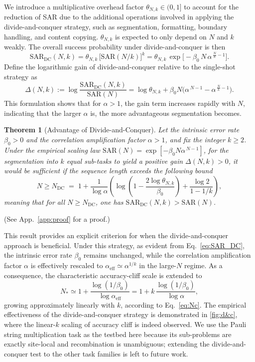 \documentclass{article}
\theoremstyle{plain}
\newtheorem{theorem}{Theorem}
\begin{document}
We introduce a multiplicative overhead factor $\theta_{N,k}\in(0,1]$ to account for the reduction of SAR due to the additional operations involved in applying the divide-and-conquer strategy, such as segmentation, formatting, boundary handling, and content copying. $\theta_{N,k}$ is expected to only  depend on $N$ and $k$ weakly. The overall success probability under divide-and-conquer is then
\begin{equation}\label{eq:SAR_DC}
\mathrm{SAR}_{\mathrm{DC}}(N,k)
= \theta_{N,k}\,\big[\mathrm{SAR}(N/k)\big]^k
= \theta_{N,k}\,\exp\!\Big[-\beta_0\,N\,\alpha^{\,\frac{N}{k}-1}\Big].
\end{equation}
Define the logarithmic gain of divide-and-conquer relative to the single-shot strategy as
\begin{equation}
\Delta(N,k)
:= \log \frac{\mathrm{SAR}_{\mathrm{DC}}(N,k)}{\mathrm{SAR}(N)}
= \log \theta_{N,k} + \beta_0 N \Big( \alpha^{\,N-1} - \alpha^{\,\frac{N}{k}-1} \Big).
\end{equation}
This formulation shows that for $\alpha>1$, the gain term increases rapidly with $N$, indicating that the larger $\alpha$ is, the more advantageous segmentation becomes.

\begin{theorem}[Advantage of Divide-and-Conquer]\label{theorem1}
Let the intrinsic error rate $\beta_0>0$ and the correlation amplification factor $\alpha>1$, and fix the integer $k\ge2$.
Under the empirical scaling law $\mathrm{SAR}(N)=\exp[-\beta_0 N \alpha^{\,N-1}]$, for the segmentation into $k$ equal sub-tasks to yield a positive gain $\Delta(N,k)>0$, it would be sufficient if the sequence length exceeds the following bound
\begin{equation}
N\geq N_{\mathrm{DC}} \;=\; 1 + \frac{1}{\log\alpha}\left(\log\left(1-\frac{2\log\theta_{N,k}}{\beta_0}\right)+\frac{\log 2}{1-1/k}\right),
\end{equation}
meaning that for all $N \ge N_{\mathrm{DC}}$, one has $\mathrm{SAR}_{\mathrm{DC}}(N,k) > \mathrm{SAR}(N)$.
\end{theorem} (See App.~\ref{app:proof} for a proof.)

This result provides an explicit criterion for when the divide-and-conquer approach is beneficial.
Under this strategy, as evident from Eq.~\eqref{eq:SAR_DC}, the intrinsic error rate $\beta_0$ remains unchanged, while the correlation amplification factor $\alpha$ is effectively rescaled to $\alpha_\text{eff}\simeq \alpha^{1/k}$ in the large-$N$ regime.
As a consequence, the characteristic accuracy-cliff scale is extended to
\begin{equation}
    N_* \simeq 1+\frac{\log(1/\beta_0)}{\log \alpha_\text{eff}}=1+k\,\frac{\log(1/\beta_0)}{\log \alpha},
\end{equation}
growing approximately linearly with $k$, according to Eq.~\eqref{eq:Nc}.  The empirical effectiveness of the divide-and-conquer strategy is demonstrated in \cref{fig:d&c}, where the linear-$k$ scaling of accuracy cliff is indeed observed. We use the Pauli string multiplication task as the testbed here because its sub-problems are exactly site-local and recombination is unambiguous; extending the divide-and-conquer test to the other task families is left to future work.
\end{document}
